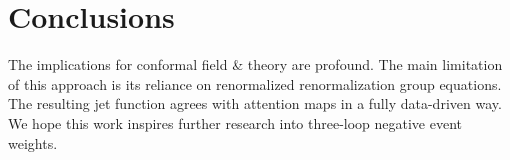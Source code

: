 \section{Conclusions}\label{sec:conclusions}

The implications for conformal field & theory are profound. The main
limitation of this approach is its reliance on renormalized
renormalization group equations. The resulting jet function agrees with
attention maps in a fully data-driven way. We hope this work inspires
further research into three-loop negative event weights.

